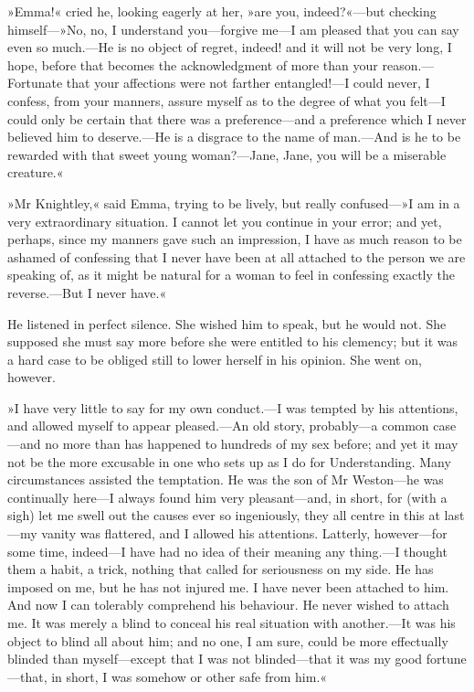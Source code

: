 »Emma!« cried he, looking eagerly at her, »are you, indeed?«—but checking himself—»No, no, I understand you—forgive me—I am pleased that you can say even so much.—He is no object of regret, indeed! and it will not be very long, I hope, before that becomes the acknowledgment of more than your reason.—Fortunate that your affections were not farther entangled!—I could never, I confess, from your manners, assure myself as to the degree of what you felt—I could only be certain that there was a preference—and a preference which I never believed him to deserve.—He is a disgrace to the name of man.—And is he to be rewarded with that sweet young woman?—Jane, Jane, you will be a miserable creature.«

»Mr Knightley,« said Emma, trying to be lively, but really confused—»I am in a very extraordinary situation. I cannot let you continue in your error; and yet, perhaps, since my manners gave such an impression, I have as much reason to be ashamed of confessing that I never have been at all attached to the person we are speaking of, as it might be natural for a woman to feel in confessing exactly the reverse.—But I never have.«

He listened in perfect silence. She wished him to speak, but he would not. She supposed she must say more before she were entitled to his clemency; but it was a hard case to be obliged still to lower herself in his opinion. She went on, however.

»I have very little to say for my own conduct.—I was tempted by his attentions, and allowed myself to appear pleased.—An old story, probably—a common case—and no more than has happened to hundreds of my sex before; and yet it may not be the more excusable in one who sets up as I do for Understanding. Many circumstances assisted the temptation. He was the son of Mr Weston—he was continually here—I always found him very pleasant—and, in short, for (with a sigh) let me swell out the causes ever so ingeniously, they all centre in this at last—my vanity was flattered, and I allowed his attentions. Latterly, however—for some time, indeed—I have had no idea of their meaning any thing.—I thought them a habit, a trick, nothing that called for seriousness on my side. He has imposed on me, but he has not injured me. I have never been attached to him. And now I can tolerably comprehend his behaviour. He never wished to attach me. It was merely a blind to conceal his real situation with another.—It was his object to blind all about him; and no one, I am sure, could be more effectually blinded than myself—except that I was not blinded—that it was my good fortune—that, in short, I was somehow or other safe from him.«


